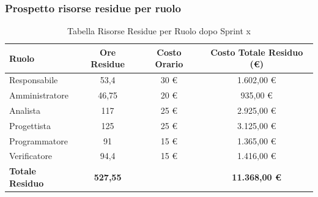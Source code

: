 \subsubsection{Prospetto risorse residue per ruolo}
\begin{table}[H]
    \centering
    \renewcommand{\arraystretch}{1.3}
    \begin{tabularx}{\textwidth}{|X|c|c|c|}
        \hline
        \textbf{Ruolo} & \textbf{Ore Residue} & \textbf{Costo Orario} & \textbf{Costo Totale Residuo (\euro)} \\
        \hline
        Responsabile & 53,4 & 30 \euro & 1.602,00 \euro \\
        Amministratore & 46,75 & 20 \euro & 935,00 \euro \\
        Analista & 117 & 25 \euro & 2.925,00 \euro \\
        Progettista & 125 & 25 \euro & 3.125,00 \euro \\
        Programmatore & 91 & 15 \euro & 1.365,00 \euro \\
        Verificatore & 94,4 & 15 \euro & 1.416,00 \euro \\
        \hline
        \textbf{Totale Residuo} & \textbf{527,55} & & \textbf{11.368,00 \euro} \\
        \hline
    \end{tabularx}
    \caption{Tabella Risorse Residue per Ruolo dopo Sprint x}
\end{table}

